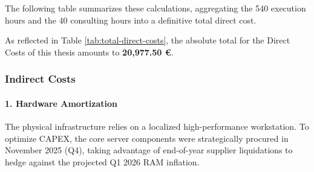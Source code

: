 The following table summarizes these calculations, aggregating the 540 execution hours and the 40 consulting hours into a definitive total direct cost.

\begin{table}[H]
\centering
\caption{Final calculation of the Direct Costs, combining the established hourly rates with the exact hour allocation per role.}
\label{tab:total-direct-costs}
\end{table}

As reflected in Table \ref{tab:total-direct-costs}, the absolute total for the Direct Costs of this thesis amounts to \textbf{20,977.50 \euro}. 



\subsubsection{Indirect Costs}
\label{subsubsec:indirect-costs}

\paragraph{1. Hardware Amortization}
The physical infrastructure relies on a localized high-performance workstation. To optimize CAPEX, the core server components were strategically procured in November 2025 (Q4), taking advantage of end-of-year supplier liquidations to hedge against the projected Q1 2026 RAM inflation. 

